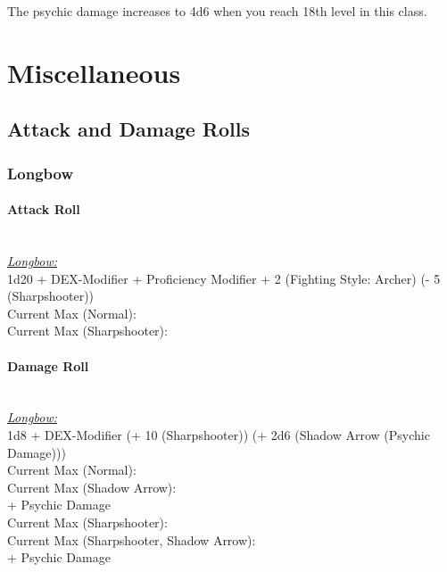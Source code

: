 \documentclass[letterpaper,openany,oneside,twocolumn]{book}
\begin{document}
The psychic damage increases to 4d6 when you reach 18th level in this class.

\vfill\eject

\section*{Miscellaneous}
\subsection*{Attack and Damage Rolls}
\subsubsection*{Longbow}
\paragraph*{Attack Roll}\hfill\\
\underline{\textit{Longbow:}}\\
1d20 + DEX-Modifier + Proficiency Modifier + 2 (Fighting Style: Archer) (- 5 (Sharpshooter)) \\
\indent Current Max (Normal):  \\
\indent Current Max (Sharpshooter): \\
\paragraph*{Damage Roll}\hfill\\
\underline{\textit{Longbow:}}\\
1d8 + DEX-Modifier (+ 10 (Sharpshooter)) (+ 2d6 (Shadow Arrow (Psychic Damage)))\\
\indent Current Max (Normal):  \\
\indent Current Max (Shadow Arrow):\\\indent\indent{} +  Psychic Damage \\
\indent Current Max (Sharpshooter):  \\
\indent Current Max (Sharpshooter, Shadow Arrow):\\\indent\indent{} +  Psychic Damage
\end{document}
